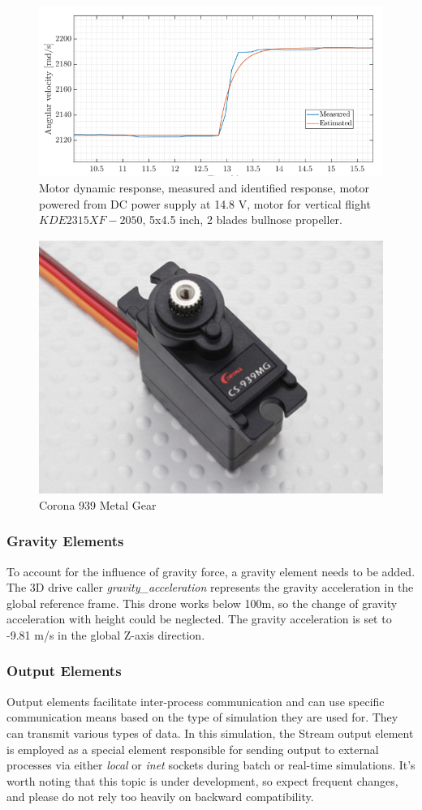 \begin{figure}
    \centering
    \includegraphics[width=0.75\linewidth]{Images/Motor dynamic response2.png}
    \caption{Motor dynamic response, measured and identified response, motor powered from DC power supply at 14.8 V, motor for vertical flight $KDE2315XF-2050$, 5x4.5 inch, 2 blades bullnose propeller.}
    \label{fig:Motor dynamic response2}
\end{figure}

\begin{figure}
    \centering
    \includegraphics[width=0.5\linewidth]{Images/Corona 939 Metal Gear.png}
    \caption{Corona 939 Metal Gear}
    \label{fig:Corona 939 Metal Gear}
\end{figure}

\subsubsection{Gravity Elements}
To account for the influence of gravity force, a gravity element needs to be added. The 3D drive caller \textit{gravity\_acceleration} represents the gravity acceleration in the global reference frame.
This drone works below 100m, so the change of gravity acceleration with height could be neglected. The gravity acceleration is set to -9.81 m/s in the global Z-axis direction.

\subsubsection{Output Elements}
Output elements facilitate inter-process communication and can use specific communication means based on the type of simulation they are used for. They can transmit various types of data. In this simulation, the Stream output element is employed as a special element responsible for sending output to external processes via either \textit{local} or \textit{inet} sockets during batch or real-time simulations. It's worth noting that this topic is under development, so expect frequent changes, and please do not rely too heavily on backward compatibility. 

